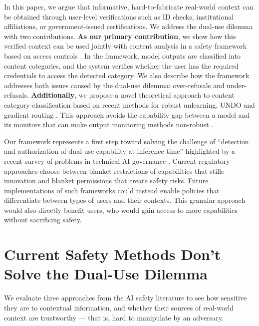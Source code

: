 \documentclass{article}
\theoremstyle{plain}
\theoremstyle{definition}
\theoremstyle{remark}
\begin{document}
In this paper, we argue that informative, hard-to-fabricate real-world context can be obtained through user-level verifications such as ID checks, institutional affiliations, or government-issued certifications.
We address the dual-use dilemma with two contributions.
\textbf{As our primary contribution}, we show how this verified context can be used jointly with content analysis in a safety framework based on access controls \cite{butler1974}.
In the framework, model outputs are classified into content categories, and the system verifies whether the user has the required credentials to access the detected category.
We also describe how the framework addresses both issues caused by the dual-use dilemma: over-refusals and under-refusals.
\textbf{Additionally}, we propose a novel theoretical approach to content category classification based on recent methods for robust unlearning, UNDO \cite{lee2025distillationrobustifiesunlearning} and gradient routing \cite{cloud2024gradientroutingmaskinggradients}.
This approach avoids the capability gap between a model and its monitors that can make output monitoring methods non-robust \cite{jin2024jailbreakinglargelanguagemodels}.

Our framework represents a first step toward solving the challenge of ``detection and authorization of dual-use capability at inference time'' highlighted by a recent survey of problems in technical AI governance \cite{reuel2025openproblemstechnicalai}.
Current regulatory approaches choose between blanket restrictions of capabilities that stifle innovation and blanket permissions that create safety risks.
Future implementations of such frameworks could instead enable policies that differentiate between types of users and their contexts.
This granular approach would also directly benefit users, who would gain access to more capabilities without sacrificing safety.

\section{Current Safety Methods Don't Solve the Dual-Use Dilemma}
\label{section:current-methods}

We evaluate three approaches from the AI safety literature to see how sensitive they are to contextual information, and whether their sources of real-world context are trustworthy --- that is, hard to manipulate by an adversary.

\end{document}
